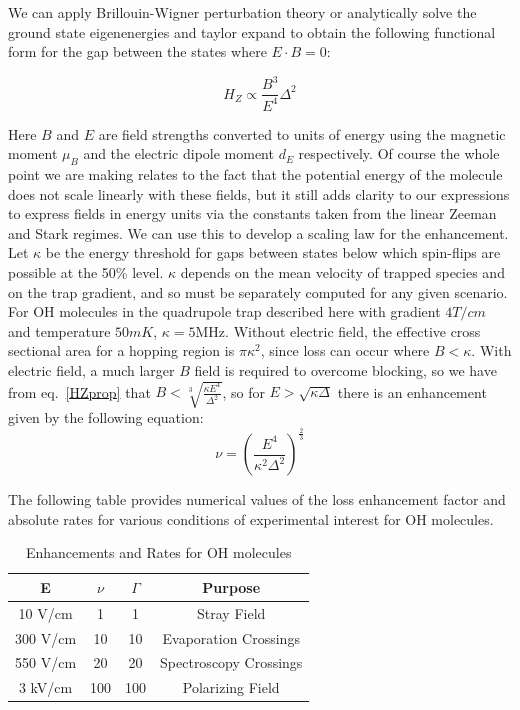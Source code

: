 \documentclass[%
 reprint,
 amsmath,amssymb,
 aps,
prl,
]{revtex4-1}
\begin{document}
We can apply Brillouin-Wigner perturbation theory or analytically solve the ground state eigenenergies and taylor expand to obtain the following functional form for the gap between the states where $E\cdot B=0$:

\begin{equation}
\label{eq:HZprop}
H_Z\propto \frac{B^3}{E^4}\Delta^2
\end{equation}

\noindent Here $B$ and $E$ are field strengths converted to units of energy using the magnetic moment $\mu_B$ and the electric dipole moment $d_E$ respectively. Of course the whole point we are making relates to the fact that the potential energy of the molecule does not scale linearly with these fields, but it still adds clarity to our expressions to express fields in energy units via the constants taken from the linear Zeeman and Stark regimes. We can use this to develop a scaling law for the enhancement. Let $\kappa$ be the energy threshold for gaps between states below which spin-flips are possible at the 50\% level. $\kappa$ depends on the mean velocity of trapped species and on the trap gradient, and so must be separately computed for any given scenario. For OH molecules in the quadrupole trap described here \cite{} with gradient $4T/cm$ and temperature $50mK$, $\kappa=5\text{MHz}$. Without electric field, the effective cross sectional area for a hopping region is $\pi \kappa^2$, since loss can occur where $B<\kappa$. With electric field, a much larger $B$ field is required to overcome blocking, so we have from eq.~\ref{HZprop} that $B < \sqrt[3]{\frac{\kappa E^4}{\Delta^2}}$, so for $E>\sqrt{\kappa\Delta}$ there is an enhancement given by the following equation:
\begin{equation}
\nu = \left(\frac{E^4}{\kappa^2\Delta^2}\right)^\frac{2}{3}
\label{eq:blimit}
\end{equation} 

The following table provides numerical values of the loss enhancement factor and absolute rates for various conditions of experimental interest for OH molecules.

\begin{table}[h]
\caption{Enhancements and Rates for OH molecules}
\label{tab:rates}
\begin{tabular}{c|ccc}
\toprule
E & $\nu$ & $\Gamma$ & Purpose \\
\toprule
10 V/cm & 1 & 1 & Stray Field \\
300 V/cm & 10 & 10 & Evaporation Crossings\\
550 V/cm & 20 & 20 & Spectroscopy Crossings\\
3 kV/cm & 100 & 100 & Polarizing Field\\
\toprule
\end{tabular}
\end{table}
\end{document}
